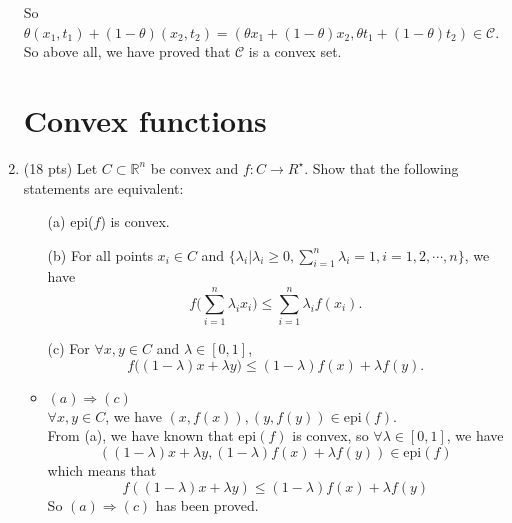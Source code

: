 \documentclass[10pt]{article}
\begin{document}
\begin{enumerate}
So $\theta(x_1,t_1)+(1-\theta)(x_2,t_2)=(\theta x_1+(1-\theta)x_2,\theta t_1+(1-\theta)t_2)\in \mathcal{C}$.\\

So above all, we have proved that $\mathcal{C}$ is a convex set.\\


\newpage

\section{Convex functions}
\item {\color{red} (18 pts)} Let $C\subset \mathbb{R}^n$ be convex and $f:C\rightarrow R^\star$. Show that the following statements are equivalent:
\begin{itemize}
    \item[(a)] epi($f$) is convex.
    \item[(b)] For all points $x_i\in C$ and $\{\lambda_i|\lambda_i\geq0, \sum_{i=1}^n \lambda_i=1, i=1,2,\cdots,n\}$, we have
    \begin{equation*}
        f\Big(\sum\limits_{i=1}^n \lambda_ix_i\Big)\leq \sum\limits_{i=1}^n \lambda_if(x_i).
    \end{equation*}
    \item[(c)] For $\forall x,y\in C$ and $\lambda\in[0,1]$,
    \begin{equation*}
        f\Big((1-\lambda)x+\lambda y\Big)\leq(1-\lambda)f(x)+\lambda f(y).
    \end{equation*}
\end{itemize}

\begin{itemize}
    \item $ (a) \Rightarrow (c)$\\
    $\forall x,y\in C$, we have $(x,f(x)),(y,f(y))\in \text{epi}(f)$.\\
    From (a), we have known that epi$(f)$ is convex, so $\forall\lambda\in [0,1]$, we have 
    $$((1-\lambda)x+\lambda y, (1-\lambda)f(x)+\lambda f(y))\in\text{epi}(f)$$
    which means that
    $$f((1-\lambda)x+\lambda y)\leq (1-\lambda)f(x)+\lambda f(y)$$
    So $ (a) \Rightarrow (c)$ has been proved.\\
    

\end{itemize}
\end{enumerate}
\end{document}
